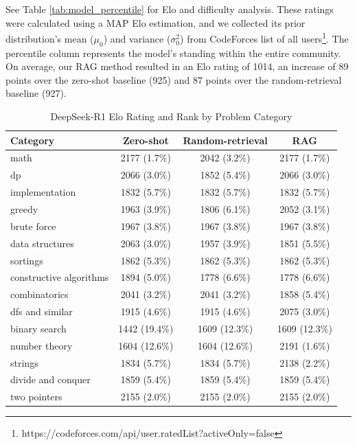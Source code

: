 \documentclass[preprint,12pt]{elsarticle}
\begin{document}
See Table \ref{tab:model_percentile} for Elo and difficulty analysis. These ratings were calculated using a MAP Elo estimation, and we collected its prior distribution's mean ($\mu_0$) and variance ($\sigma_0^2$) from CodeForces list of all users\footnote{https://codeforces.com/api/user.ratedList?activeOnly=false}. The percentile column represents the model's standing within the entire community. On average, our RAG method resulted in an Elo rating of 1014, an increase of 89 points over the zero-shot baseline (925) and 87 points over the random-retrieval baseline (927).

\begin{table}[ht]
\centering
\caption{DeepSeek-R1 Elo Rating and Rank by Problem Category}
\label{tab:category_performance}
\begin{tabular}{@{}lccc@{}}
\toprule
\textbf{Category} & \textbf{Zero-shot} & \textbf{Random-retrieval} & \textbf{RAG} \\
\midrule
math & 2177 (1.7\%) & 2042 (3.2\%) & 2177 (1.7\%) \\
dp & 2066 (3.0\%) & 1852 (5.4\%) & 2066 (3.0\%) \\
implementation & 1832 (5.7\%) & 1832 (5.7\%) & 1832 (5.7\%) \\
greedy & 1963 (3.9\%) & 1806 (6.1\%) & 2052 (3.1\%) \\
brute force & 1967 (3.8\%) & 1967 (3.8\%) & 1967 (3.8\%) \\
data structures & 2063 (3.0\%) & 1957 (3.9\%) & 1851 (5.5\%) \\
sortings & 1862 (5.3\%) & 1862 (5.3\%) & 1862 (5.3\%) \\
constructive algorithms & 1894 (5.0\%) & 1778 (6.6\%) & 1778 (6.6\%) \\
combinatorics & 2041 (3.2\%) & 2041 (3.2\%) & 1858 (5.4\%) \\
dfs and similar & 1915 (4.6\%) & 1915 (4.6\%) & 2075 (3.0\%) \\
binary search & 1442 (19.4\%) & 1609 (12.3\%) & 1609 (12.3\%) \\
number theory & 1604 (12.6\%) & 1604 (12.6\%) & 2191 (1.6\%) \\
strings & 1834 (5.7\%) & 1834 (5.7\%) & 2138 (2.2\%) \\
divide and conquer & 1859 (5.4\%) & 1859 (5.4\%) & 1859 (5.4\%) \\
two pointers & 2155 (2.0\%) & 2155 (2.0\%) & 2155 (2.0\%) \\
\bottomrule
\end{tabular}
\end{table}
\end{document}
